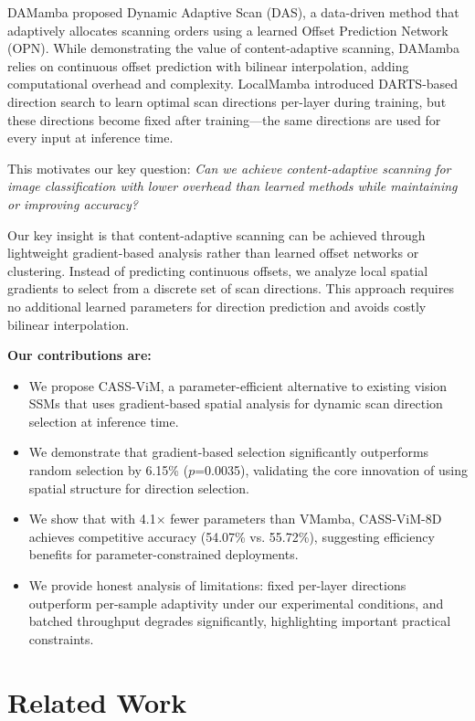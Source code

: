 \documentclass{article}
\begin{document}
DAMamba \cite{li2025damamba} proposed Dynamic Adaptive Scan (DAS), a data-driven method that adaptively allocates scanning orders using a learned Offset Prediction Network (OPN). While demonstrating the value of content-adaptive scanning, DAMamba relies on continuous offset prediction with bilinear interpolation, adding computational overhead and complexity. LocalMamba introduced DARTS-based direction search to learn optimal scan directions per-layer during training, but these directions become fixed after training---the same directions are used for every input at inference time.

This motivates our key question: \textit{Can we achieve content-adaptive scanning for image classification with lower overhead than learned methods while maintaining or improving accuracy?}

Our key insight is that content-adaptive scanning can be achieved through lightweight gradient-based analysis rather than learned offset networks or clustering. Instead of predicting continuous offsets, we analyze local spatial gradients to select from a discrete set of scan directions. This approach requires no additional learned parameters for direction prediction and avoids costly bilinear interpolation.

\textbf{Our contributions are:}
\begin{itemize}
    \item We propose CASS-ViM, a parameter-efficient alternative to existing vision SSMs that uses gradient-based spatial analysis for dynamic scan direction selection at inference time.
    \item We demonstrate that gradient-based selection significantly outperforms random selection by 6.15\% ($p$=0.0035), validating the core innovation of using spatial structure for direction selection.
    \item We show that with 4.1$\times$ fewer parameters than VMamba, CASS-ViM-8D achieves competitive accuracy (54.07\% vs. 55.72\%), suggesting efficiency benefits for parameter-constrained deployments.
    \item We provide honest analysis of limitations: fixed per-layer directions outperform per-sample adaptivity under our experimental conditions, and batched throughput degrades significantly, highlighting important practical constraints.
\end{itemize}

\section{Related Work}
\label{sec:related_work}
\end{document}
